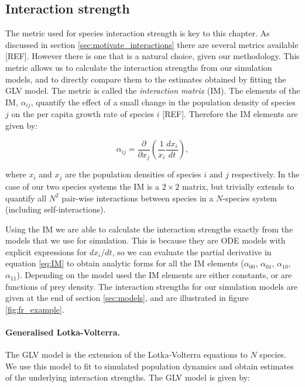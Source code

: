 \subsection{Interaction strength}
\label{sec:interaction_strength}


The metric used for species interaction strength is key to this chapter. As discussed in section \ref{sec:motivate_interactions} there are several metrics available [REF]. However there is one that is a natural choice, given our methodology. This metric allows us to calculate the interaction strengths from our simulation models, and to directly compare them to the estimates obtained by fitting the GLV model. The metric is called the \emph{interaction matrix} (IM). The elements of the IM, $\alpha_{ij}$, quantify the effect of a small change in the population density of species $j$ on the per capita growth rate of species $i$ [REF]. Therefore the IM elements are given by:

\begin{equation}
\alpha_{ij} = \frac{\partial}{\partial x_{j}}\left(\frac{1}{x_{i}} \frac{dx_i}{dt} \right),
\label{eq:IM}
\end{equation}

where $x_i$ and $x_j$ are the population densities of species $i$ and $j$ respectively.  In the case of our two species systems the IM is a $2 \times 2$ matrix, but trivially extends to quantify all $N^2$ pair-wise interactions between species in a $N$-species system (including self-interactions). 

Using the IM we are able to calculate the interaction strengths exactly from the models that we use for simulation. This is because they are ODE models with explicit expressions for $dx_i / dt$, so we can evaluate the partial derivative in equation \ref{eq:IM} to obtain analytic forms for all the IM elements ($\alpha_{00}$, $\alpha_{01}$, $\alpha_{10}$,$\alpha_{11}$). Depending on the model used the IM elements are either constants, or are functions of prey density. The interaction strengths for our simulation models are given at the end of section \ref{sec:models}, and are illustrated in figure \ref{fig:fr_example}.

\paragraph*{Generalised Lotka-Volterra.} The GLV model is the extension of the Lotka-Volterra equations to $N$ species. We use this model to fit to simulated population dynamics and obtain estimates of the underlying interaction strengths. The GLV model is given by:

